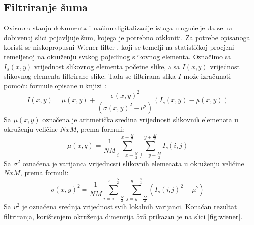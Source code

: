 \documentclass[times, utf8, zavrsni, numeric]{fer}
\begin{document}
\subsection{Filtriranje šuma}
Ovisno o stanju dokumenta i načinu digitalizacije istoga moguće je da se na dobivenoj slici pojavljuje šum, kojega je potrebno otkloniti.
Za potrebe opisanoga koristi se niskopropusni Wiener filter \cite{book:Two-Dimensional-Signal-Image-Processing}, koji se temelji na statističkoj procjeni temeljenoj na okruženju svakog pojedinog slikovnog elementa. \cite{AdaptiveBinarization}
Označimo sa $I_s(x, y)$ vrijednost slikovnog elementa početne slike, a sa $I(x, y)$ vrijednost slikovnog elementa filtrirane slike.
Tada se filtrirana slika $I$ može izračunati pomoću formule opisane u knjizi \cite{book:Two-Dimensional-Signal-Image-Processing}:
\[I(x, y) = \mu(x, y) + \frac{\sigma(x, y)^2}{(\sigma(x, y)^2 - v^2)}(I_s(x, y) - \mu(x, y))\]
Sa $\mu(x, y)$ označena je aritmetička sredina vrijednosti slikovnih elemenata u okruženju veličine $NxM$, prema formuli:
\[\mu(x, y) = \frac{1}{NM} 
    \displaystyle \sum_{i = x-\frac{N}{2}}^{x+\frac{N}{2}}
    \displaystyle \sum_{j = y-\frac{M}{2}}^{y+\frac{M}{2}}
I_s(i, j)\]
Sa $\sigma^2$ označena je varijanca vrijednosti slikovnih elemenata u okruženju veličine $NxM$, prema formuli:
\[\sigma(x, y)^2 = \frac{1}{NM} 
    \displaystyle \sum_{i = x-\frac{N}{2}}^{x+\frac{N}{2}}
    \displaystyle \sum_{j = y-\frac{M}{2}}^{y+\frac{M}{2}}
(I_s(i, j)^2 - \mu^2)\]
Sa $v^2$ je označena srednja vrijednost svih lokalnih varijanci.
Konačan rezultat filtriranja, korištenjem okruženja dimenzija $5$x$5$ prikazan je na slici \ref{fig:wiener}.
\end{document}
